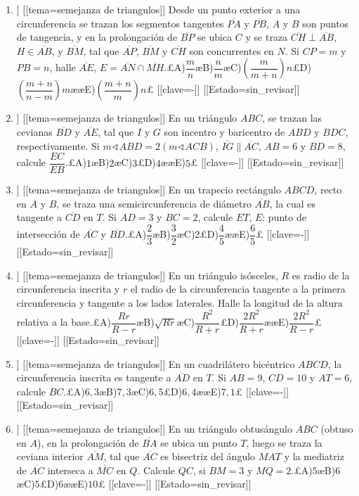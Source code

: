 \begin{enumerate}
\item[\textbf{25.}] [[curso=Geometria]] [[tema=semejanza de triangulos]] Desde un punto exterior a una circunferencia se trazan los segmentos tangentes $\overline{PA}$ y $\overline{PB}$, $A$ y $B$ son puntos de tangencia, y en la prolongación de $\overline{BP}$ se ubica $C$ y se traza $\overline{CH}\perp\overline{AB}$, $H\in\overline{AB}$, y $\overline{BM}$, tal que $\overline{AP}$, $\overline{BM}$ y $\overline{CH}$ son concurrentes en $N$. Si $CP=m$ y $PB=n$, halle $\overline{AE}$, ${E}=\overline{AN}\cap\overline{MH}$.£A)$\dfrac{m}{n}$æB)$\dfrac{n}{m}$æC)$\left(\dfrac{m}{m+n}\right)n$£D)$\left(\dfrac{m+n}{n-m}\right)m$ææE)$\left(\dfrac{m+n}{m}\right)n$£ [[clave=-]] [[Estado=sin_revisar]]
\item[\textbf{26.}] [[curso=Geometria]] [[tema=semejanza de triangulos]] En un triángulo $ABC$, se trazan las cevianas $\overline{BD}$ y $\overline{AE}$, tal que $I$ y $G$ son incentro y baricentro de $ABD$ y $BDC$, respectivamente. Si $m\sphericalangle ABD=2(m\sphericalangle ACB)$, $\overline{IG}\parallel\overline{AC}$, $AB=6$ y $BD=8$, calcule $\dfrac{EC}{EB}$.£A)$1$æB)$2$æC)$3$£D)$4$ææE)$5$£ [[clave=-]] [[Estado=sin_revisar]]
\item[\textbf{27.}] [[curso=Geometria]] [[tema=semejanza de triangulos]] En un trapecio rectángulo $ABCD$, recto en $A$ y $B$, se traza una semicircunferencia de diámetro $\overline{AB}$, la cual es tangente a $\overline{CD}$ en $T$. Si $AD=3$ y $BC=2$, calcule $ET$, $E$: punto de intersección de $\overline{AC}$ y $\overline{BD}$.£A)$\dfrac{2}{3}$æB)$\dfrac{3}{2}$æC)$2$£D)$\dfrac{4}{5}$ææE)$\dfrac{6}{5}$£ [[clave=-]] [[Estado=sin_revisar]]
\item[\textbf{28.}] [[curso=Geometria]] [[tema=semejanza de triangulos]] En un triángulo isósceles, $R$ es radio de la circunferencia inscrita y $r$ el radio de la circunferencia tangente a la primera circunferencia y tangente a los lados laterales. Halle la longitud de la altura relativa a la base.£A)$\dfrac{Rr}{R-r}$æB)$\sqrt{Rr}$æC)$\dfrac{R^2}{R+r}$£D)$\dfrac{2R^2}{R+r}$ææE)$\dfrac{2R^2}{R-r}$£ [[clave=-]] [[Estado=sin_revisar]]
\item[\textbf{29.}] [[curso=Geometria]] [[tema=semejanza de triangulos]] En un cuadrilátero bicéntrico $ABCD$, la circunferencia inscrita es tangente a $\overline{AD}$ en $T$. Si $AB=9$, $CD=10$ y $AT=6$, calcule $BC$.£A)$6,3$æB)$7,3$æC)$6,5$£D)$6,4$ææE)$7,1$£ [[clave=-]] [[Estado=sin_revisar]]
\item[\textbf{30.}] [[curso=Geometria]] [[tema=semejanza de triangulos]] En un triángulo obtusángulo $ABC$ (obtuso en $A$), en la prolongación de $\overline{BA}$ se ubica un punto $T$, luego se traza la ceviana interior $\overline{AM}$, tal que $\overline{AC}$ es bisectriz del ángulo $MAT$ y la mediatriz de $\overline{AC}$ interseca a $\overline{MC}$ en $Q$. Calcule $QC$, si $BM=3$ y $MQ=2$.£A)$5$æB)$6$æC)$5$£D)$6$ææE)$10$£ [[clave=-]] [[Estado=sin_revisar]]
\end{enumerate}
